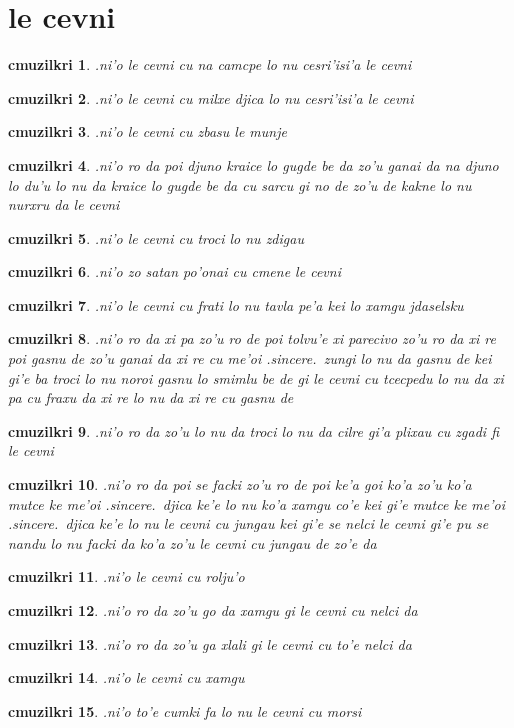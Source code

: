 \documentclass{report}
\newtheorem{cmuzilkri}{cmuzilkri}
\begin{document}
\section{le cevni}
\begin{cmuzilkri}
	.ni'o le cevni cu na camcpe lo nu cesri'isi'a le cevni
\end{cmuzilkri}
\begin{cmuzilkri}
	.ni'o le cevni cu milxe djica lo nu cesri'isi'a le cevni
\end{cmuzilkri}
\begin{cmuzilkri}
	.ni'o le cevni cu zbasu le munje
\end{cmuzilkri}
\begin{cmuzilkri}
	.ni'o ro da poi djuno kraice lo gugde be da zo'u ganai da na djuno lo du'u lo nu da kraice lo gugde be da cu sarcu gi no de zo'u de kakne lo nu nurxru da le cevni
\end{cmuzilkri}
\begin{cmuzilkri}
	.ni'o le cevni cu troci lo nu zdigau
\end{cmuzilkri}
\begin{cmuzilkri}
	.ni'o zo satan po'onai cu cmene le cevni
\end{cmuzilkri}
\begin{cmuzilkri}
	.ni'o le cevni cu frati lo nu tavla pe'a kei lo xamgu jdaselsku
\end{cmuzilkri}
\begin{cmuzilkri}
	.ni'o ro da xi pa zo'u ro de poi tolvu'e xi parecivo zo'u ro da xi re poi gasnu de zo'u ganai da xi re cu me'oi .sincere.\ zungi lo nu da gasnu de kei gi'e ba troci lo nu noroi gasnu lo smimlu be de gi le cevni cu tcecpedu lo nu da xi pa cu fraxu da xi re lo nu da xi re cu gasnu de
\end{cmuzilkri}
\begin{cmuzilkri}
	.ni'o ro da zo'u lo nu da troci lo nu da cilre gi'a plixau cu zgadi fi le cevni
\end{cmuzilkri}
\begin{cmuzilkri}
	.ni'o ro da poi se facki zo'u ro de poi ke'a goi ko'a zo'u ko'a mutce ke me'oi .sincere.\ djica ke'e lo nu ko'a xamgu co'e kei gi'e mutce ke me'oi .sincere.\ djica ke'e lo nu le cevni cu jungau kei gi'e se nelci le cevni gi'e pu se nandu lo nu facki da ko'a zo'u le cevni cu jungau de zo'e da
\end{cmuzilkri}
\begin{cmuzilkri}
	.ni'o le cevni cu rolju'o
\end{cmuzilkri}
\begin{cmuzilkri}
	.ni'o ro da zo'u go da xamgu gi le cevni cu nelci da
\end{cmuzilkri}
\begin{cmuzilkri}
	.ni'o ro da zo'u ga xlali gi le cevni cu to'e nelci da
\end{cmuzilkri}
\begin{cmuzilkri}
	.ni'o le cevni cu xamgu
\end{cmuzilkri}
\begin{cmuzilkri}
	.ni'o to'e cumki fa lo nu le cevni cu morsi
\end{cmuzilkri}
\end{document}
